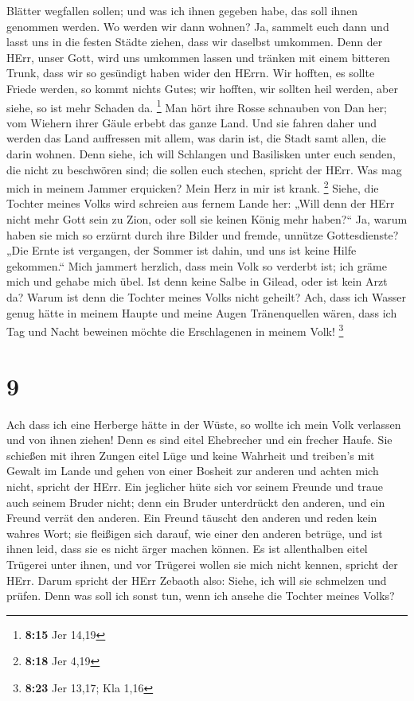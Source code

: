 Blätter wegfallen sollen; und was ich ihnen gegeben habe, das soll ihnen
genommen werden.  Wo werden wir dann wohnen? Ja, sammelt
euch dann und lasst uns in die festen Städte ziehen, dass wir daselbst
umkommen. Denn der HErr, unser Gott, wird uns umkommen lassen und
tränken mit einem bitteren Trunk, dass wir so gesündigt haben wider den
HErrn.  Wir hofften, es sollte Friede werden, so kommt
nichts Gutes; wir hofften, wir sollten heil werden, aber siehe, so ist
mehr Schaden da. \footnote{\textbf{8:15} Jer 14,19}  Man
hört ihre Rosse schnauben von Dan her; vom Wiehern ihrer Gäule erbebt
das ganze Land. Und sie fahren daher und werden das Land auffressen mit
allem, was darin ist, die Stadt samt allen, die darin wohnen.
 Denn siehe, ich will Schlangen und Basilisken unter euch
senden, die nicht zu beschwören sind; die sollen euch stechen, spricht
der HErr.  Was mag mich in meinem Jammer erquicken? Mein
Herz in mir ist krank. \footnote{\textbf{8:18} Jer 4,19} 
Siehe, die Tochter meines Volks wird schreien aus fernem Lande her:
„Will denn der HErr nicht mehr Gott sein zu Zion, oder soll sie keinen
König mehr haben?{}`` Ja, warum haben sie mich so erzürnt durch ihre
Bilder und fremde, unnütze Gottesdienste?  „Die Ernte ist
vergangen, der Sommer ist dahin, und uns ist keine Hilfe gekommen.``
 Mich jammert herzlich, dass mein Volk so verderbt ist; ich
gräme mich und gehabe mich übel.  Ist denn keine Salbe in
Gilead, oder ist kein Arzt da? Warum ist denn die Tochter meines Volks
nicht geheilt?  Ach, dass ich Wasser genug hätte in meinem
Haupte und meine Augen Tränenquellen wären, dass ich Tag und Nacht
beweinen möchte die Erschlagenen in meinem Volk! \footnote{\textbf{8:23}
  Jer 13,17; Kla 1,16}

\hypertarget{section-3}{%
\section{9}\label{section-3}}

 Ach dass ich eine Herberge hätte in der Wüste, so wollte
ich mein Volk verlassen und von ihnen ziehen! Denn es sind eitel
Ehebrecher und ein frecher Haufe.  Sie schießen mit ihren
Zungen eitel Lüge und keine Wahrheit und treiben's mit Gewalt im Lande
und gehen von einer Bosheit zur anderen und achten mich nicht, spricht
der HErr.  Ein jeglicher hüte sich vor seinem Freunde und
traue auch seinem Bruder nicht; denn ein Bruder unterdrückt den anderen,
und ein Freund verrät den anderen.  Ein Freund täuscht den
anderen und reden kein wahres Wort; sie fleißigen sich darauf, wie einer
den anderen betrüge, und ist ihnen leid, dass sie es nicht ärger machen
können.  Es ist allenthalben eitel Trügerei unter ihnen, und
vor Trügerei wollen sie mich nicht kennen, spricht der HErr.
 Darum spricht der HErr Zebaoth also: Siehe, ich will sie
schmelzen und prüfen. Denn was soll ich sonst tun, wenn ich ansehe die
Tochter meines Volks?

